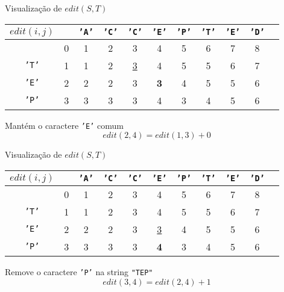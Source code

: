 \begin{frame}[fragile]{Visualização de $edit(S,T)$}

    \begin{table}
        \centering

        \begin{tabular}{c|cccccccccc} $edit(i, j)$ &
        & \textcolor{red!80!black}{\texttt{'A'}}
        & \textcolor{red!80!black}{\texttt{'C'}}
        & \textcolor{red!80!black}{\texttt{'C'}}
        & \textcolor{red!80!black}{\texttt{'E'}}
        & \textcolor{red!80!black}{\texttt{'P'}}
        & \textcolor{red!80!black}{\texttt{'T'}}
        & \textcolor{red!80!black}{\texttt{'E'}}
        & \textcolor{red!80!black}{\texttt{'D'}}\\
        \hline
&0 &1&2&3&4&5&6&7&8\\
\textcolor{red!80!black}{\texttt{'T'}}
&1 &1&2&\underline{3}&4&5&5&6&7\\
\textcolor{red!80!black}{\texttt{'E'}}
&2 &2&2&3&\textbf{3}&4&5&5&6\\
\textcolor{red!80!black}{\texttt{'P'}}
&3 &3&3&3&4&3&4&5&6\\
        \end{tabular}

    \end{table}

    Mantém o caractere
\textcolor{red!80!black}{\texttt{'E'}}
    comum
    \[
        edit(2, 4) = edit(1, 3) + 0
    \]    


\end{frame}

\begin{frame}[fragile]{Visualização de $edit(S,T)$}

    \begin{table}
        \centering

        \begin{tabular}{c|cccccccccc} $edit(i, j)$ &
        & \textcolor{red!80!black}{\texttt{'A'}}
        & \textcolor{red!80!black}{\texttt{'C'}}
        & \textcolor{red!80!black}{\texttt{'C'}}
        & \textcolor{red!80!black}{\texttt{'E'}}
        & \textcolor{red!80!black}{\texttt{'P'}}
        & \textcolor{red!80!black}{\texttt{'T'}}
        & \textcolor{red!80!black}{\texttt{'E'}}
        & \textcolor{red!80!black}{\texttt{'D'}}\\
        \hline
&0 &1&2&3&4&5&6&7&8\\
\textcolor{red!80!black}{\texttt{'T'}}
&1 &1&2&3&4&5&5&6&7\\
\textcolor{red!80!black}{\texttt{'E'}}
&2 &2&2&3&\underline{3}&4&5&5&6\\
\textcolor{red!80!black}{\texttt{'P'}}
&3 &3&3&3&\textbf{4}&3&4&5&6\\
        \end{tabular}

    \end{table}

    Remove o caractere
\textcolor{red!80!black}{\texttt{'P'}}
    na string 
\textcolor{red!80!black}{\texttt{"TEP"}}
    \[
        edit(3, 4) = edit(2, 4) + 1
    \]    


\end{frame}


